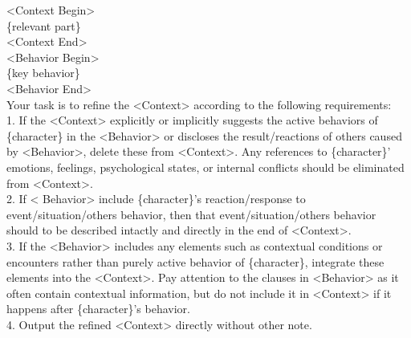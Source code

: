 \begin{tcolorbox}[title = {Context Refine}, breakable]
<Context Begin>\\
\{relevant part\}\\
<Context End>\\

<Behavior Begin>\\
\{key behavior\}\\
<Behavior End>\\

Your task is to refine the <Context> according to the following requirements:\\

1. If the <Context> explicitly or implicitly suggests the active behaviors of \{character\} in the <Behavior> or discloses the result/reactions of others caused by <Behavior>, delete these from <Context>. Any references to \{character\}' emotions, feelings, psychological states, or internal conflicts should be eliminated from <Context>.\\

2. If < Behavior> include \{character\}'s reaction/response to event/situation/others behavior, then that event/situation/others behavior should to be described intactly and directly in the end of <Context>.\\

3. If the <Behavior> includes any elements such as contextual conditions or encounters rather than purely active behavior of \{character\}, integrate these elements into the <Context>. Pay attention to the clauses in <Behavior> as it often contain contextual information, but do not include it in <Context> if it happens after \{character\}'s behavior.\\

4. Output the refined <Context> directly without other note.

\end{tcolorbox}




